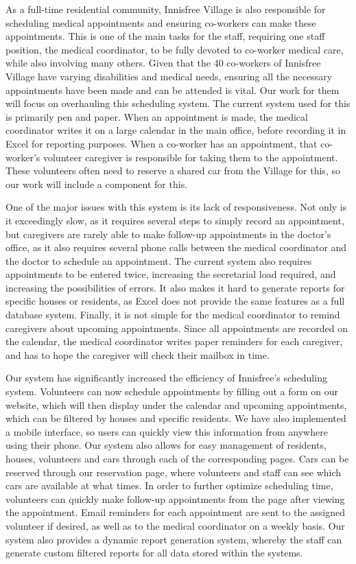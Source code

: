 \documentclass{sig-alternate}
\begin{document}
As a full-time residential community, Innisfree Village is also responsible for scheduling medical appointments and ensuring co-workers can make these appointments. This is one of the main tasks for the staff, requiring one staff position, the medical coordinator, to be fully devoted to co-worker medical care, while also involving many others. Given that the 40 co-workers of Innisfree Village have varying disabilities and medical needs, ensuring all the necessary appointments have been made and can be attended is vital. Our work for them will focus on overhauling this scheduling system. The current system used for this is primarily pen and paper. When an appointment is made, the medical coordinator writes it on a large calendar in the main office, before recording it in Excel for reporting purposes. When a co-worker has an appointment, that co-worker’s volunteer caregiver is responsible for taking them to the appointment. These volunteers often need to reserve a shared car from the Village for this, so our work will include a component for this.

One of the major issues with this system is its lack of responsiveness. Not only is it exceedingly slow, as it requires several steps to simply record an appointment, but caregivers are rarely able to make follow-up appointments in the doctor’s office, as it also requires several phone calls between the medical coordinator and the doctor to schedule an appointment. The current system also requires appointments to be entered twice, increasing the secretarial load required, and increasing the possibilities of errors. It also makes it hard to generate reports for specific houses or residents, as Excel does not provide the same features as a full database system. Finally, it is not simple for the medical coordinator to remind caregivers about upcoming appointments. Since all appointments are recorded on the calendar, the medical coordinator writes paper reminders for each caregiver, and has to hope the caregiver will check their mailbox in time.

Our system has significantly increased the efficiency of Innisfree's scheduling system. Volunteers can now schedule appointments by filling out a form on our website, which will then display under the calendar and upcoming appointments, which can be filtered by houses and specific residents. We have also implemented a mobile interface, so users can quickly view this information from anywhere using their phone. Our system also allows for easy management of residents, houses, volunteers and cars through each of the corresponding pages. Cars can be reserved through our reservation page, where volunteers and staff can see which cars are available at what times. In order to further optimize scheduling time, volunteers can quickly make follow-up appointments from the page after viewing the appointment. Email reminders for each appointment are sent to the assigned volunteer if desired, as well as to the medical coordinator on a weekly basis. Our system also provides a dynamic report generation system, whereby the staff can generate custom filtered reports for all data stored within the systems.
\end{document}
